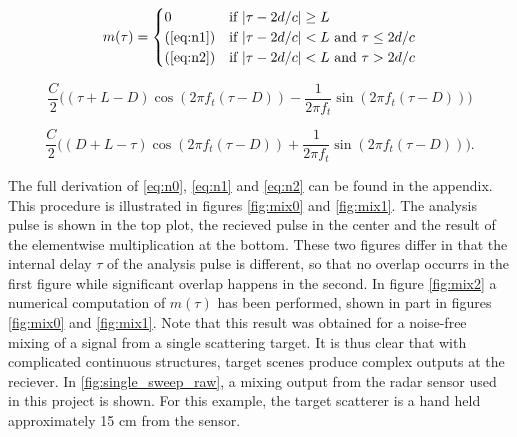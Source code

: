 \begin{equation}\label{eq:n0}
	m(\tau) = 
	\begin{cases}
		0 & \text{if $|\tau-2d/c|\geq L$} \\
		\text{(\ref{eq:n1})} & \text{if $|\tau-2d/c|<L$ and $\tau \leq 2d/c$} \\
		\text{(\ref{eq:n2})} & \text{if $|\tau-2d/c|<L$ and $\tau > 2d/c$}
	\end{cases}
\end{equation}

\begin{equation}\label{eq:n1}
	\frac{C}{2}\Big((\tau + L - D)\cos(2\pi f_t(\tau - D)) 
	- \frac{1}{2\pi f_t}\sin(2\pi f_t(\tau - D))\Big)
\end{equation}

\begin{equation}\label{eq:n2}
	\frac{C}{2}\Big((D + L - \tau)\cos(2\pi f_t(\tau - D)) 
	+ \frac{1}{2\pi f_t}\sin(2\pi f_t(\tau - D))\Big).
\end{equation}

The full derivation of \ref{eq:n0}, \ref{eq:n1} and \ref{eq:n2} can be found in the appendix. This procedure is illustrated in figures \ref{fig:mix0} and \ref{fig:mix1}. The analysis pulse is shown in the top plot, the recieved pulse in the center and the result of the elementwise multiplication at the bottom. These two figures differ in that the internal delay $\tau$ of the analysis pulse is different, so that no overlap occurrs in the first figure while significant overlap happens in the second. In figure \ref{fig:mix2} a numerical computation of $m(\tau)$ has been performed, shown in part in figures \ref{fig:mix0} and \ref{fig:mix1}. Note that this result was obtained for a noise-free mixing of a signal from a single scattering target. It is thus clear that with complicated continuous structures, target scenes produce complex outputs at the reciever. In \ref{fig:single_sweep_raw}, a mixing output from the radar sensor used in this project is shown. For this example, the target scatterer is a hand held approximately 15 cm from the sensor. 

